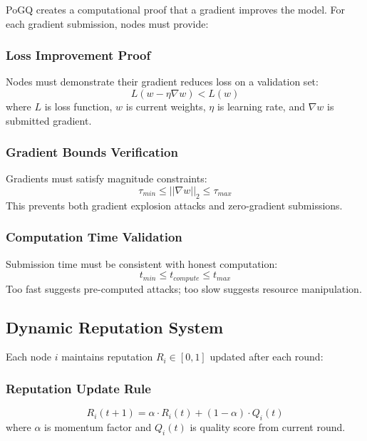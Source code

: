 \documentclass[conference]{IEEEtran}
\begin{document}
PoGQ creates a computational proof that a gradient improves the model. For each gradient submission, nodes must provide:

\subsubsection{Loss Improvement Proof}
Nodes must demonstrate their gradient reduces loss on a validation set:
\begin{equation}
L(w - \eta\nabla w) < L(w)
\end{equation}
where $L$ is loss function, $w$ is current weights, $\eta$ is learning rate, and $\nabla w$ is submitted gradient.

\subsubsection{Gradient Bounds Verification}
Gradients must satisfy magnitude constraints:
\begin{equation}
\tau_{min} \leq ||\nabla w||_2 \leq \tau_{max}
\end{equation}
This prevents both gradient explosion attacks and zero-gradient submissions.

\subsubsection{Computation Time Validation}
Submission time must be consistent with honest computation:
\begin{equation}
t_{min} \leq t_{compute} \leq t_{max}
\end{equation}
Too fast suggests pre-computed attacks; too slow suggests resource manipulation.

\subsection{Dynamic Reputation System}

Each node $i$ maintains reputation $R_i \in [0,1]$ updated after each round:

\subsubsection{Reputation Update Rule}
\begin{equation}
R_i(t+1) = \alpha \cdot R_i(t) + (1-\alpha) \cdot Q_i(t)
\end{equation}
where $\alpha$ is momentum factor and $Q_i(t)$ is quality score from current round.
\end{document}
